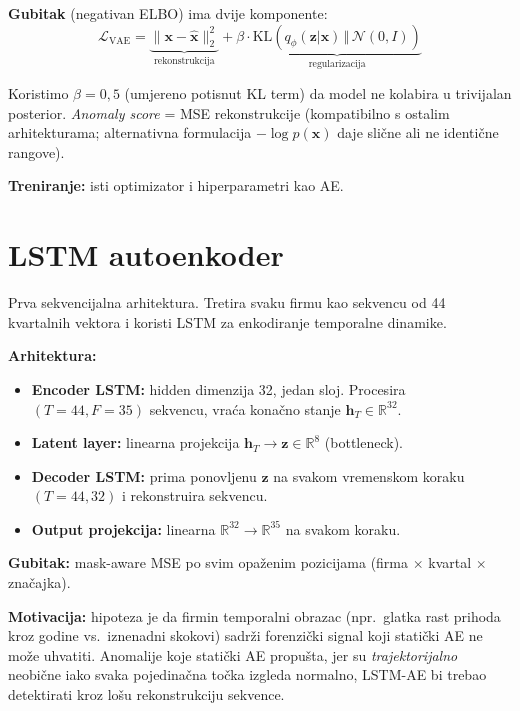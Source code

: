 \documentclass[diplomskirad,authoryear]{fer}
\begin{document}
\textbf{Gubitak} (negativan ELBO) ima dvije komponente:
\begin{equation}
\mathcal{L}_{\text{VAE}} = \underbrace{\|\mathbf{x} - \hat{\mathbf{x}}\|_2^2}_{\text{rekonstrukcija}} + \beta \cdot \underbrace{\mathrm{KL}\left( q_\phi(\mathbf{z}|\mathbf{x}) \,\Vert\, \mathcal{N}(0, I) \right)}_{\text{regularizacija}}
\end{equation}

Koristimo $\beta = 0{,}5$ (umjereno potisnut KL term) da model ne kolabira u trivijalan posterior. \emph{Anomaly score} = MSE rekonstrukcije (kompatibilno s ostalim arhitekturama; alternativna formulacija $-\log p(\mathbf{x})$ daje slične ali ne identične rangove).

\textbf{Treniranje:} isti optimizator i hiperparametri kao AE.

\section{LSTM autoenkoder}

Prva sekvencijalna arhitektura. Tretira svaku firmu kao sekvencu od 44 kvartalnih vektora i koristi LSTM \citep{hochreiter1997} za enkodiranje temporalne dinamike.

\textbf{Arhitektura:}
\begin{itemize}
 \item \textbf{Encoder LSTM:} hidden dimenzija 32, jedan sloj. Procesira $(T=44, F=35)$ sekvencu, vraća konačno stanje $\mathbf{h}_T \in \mathbb{R}^{32}$.
 \item \textbf{Latent layer:} linearna projekcija $\mathbf{h}_T \to \mathbf{z} \in \mathbb{R}^{8}$ (bottleneck).
 \item \textbf{Decoder LSTM:} prima ponovljenu $\mathbf{z}$ na svakom vremenskom koraku $(T=44, 32)$ i rekonstruira sekvencu.
 \item \textbf{Output projekcija:} linearna $\mathbb{R}^{32} \to \mathbb{R}^{35}$ na svakom koraku.
\end{itemize}

\textbf{Gubitak:} mask-aware MSE po svim opaženim pozicijama (firma $\times$ kvartal $\times$ značajka).

\textbf{Motivacija:} hipoteza je da firmin temporalni obrazac (npr.\ glatka rast prihoda kroz godine vs.\ iznenadni skokovi) sadrži forenzički signal koji statički AE ne može uhvatiti. Anomalije koje statički AE propušta, jer su \emph{trajektorijalno} neobične iako svaka pojedinačna točka izgleda normalno, LSTM-AE bi trebao detektirati kroz lošu rekonstrukciju sekvence.
\end{document}
